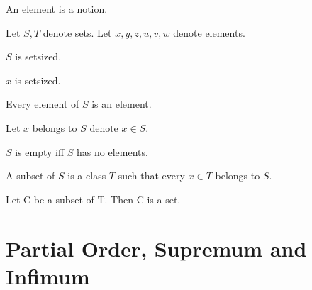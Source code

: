 \documentclass{article}
\begin{document}
  \begin{forthel}

    \begin{signature}
      An element is a notion.
    \end{signature}

    Let $S,T$ denote sets.
    Let $x,y,z,u,v,w$ denote elements.

    \begin{axiom}
      $S$ is setsized.
    \end{axiom}

    \begin{axiom}
      $x$ is setsized.
    \end{axiom}

    \begin{axiom}
      Every element of $S$ is an element.
    \end{axiom}

    Let $x$ belongs to $S$ denote $x \in S$.

    \begin{definition}[DefEmpty]
      $S$ is empty iff $S$ has no elements.
    \end{definition}

    \begin{definition}[DefSub]
      A subset of $S$ is a class $T$ such that every $x \in T$ belongs to $S$.
    \end{definition}

    \begin{axiom}
      Let C be a subset of T. Then C is a set.
    \end{axiom}
  \end{forthel}

  \section{Partial Order, Supremum and Infimum}
\end{document}
